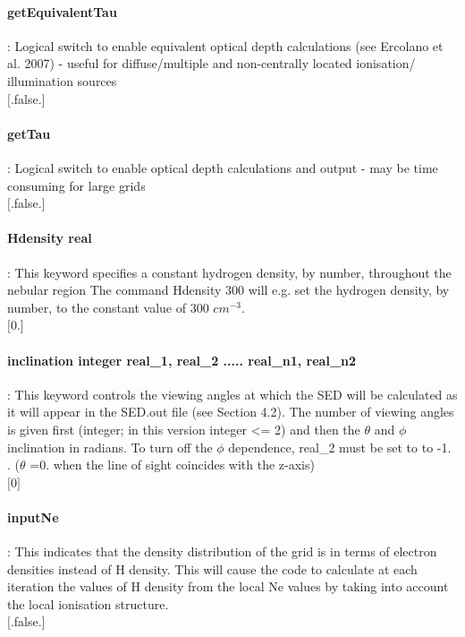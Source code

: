 \documentclass[11pt]{article}
\begin{document}
\paragraph    {getEquivalentTau} : Logical switch to enable equivalent optical depth calculations 
(see Ercolano et al. 2007) - useful for diffuse/multiple and non-centrally located ionisation/
illumination sources \\
                     $[$.false.$]$\\

\paragraph    {getTau} : Logical switch to enable optical depth calculations and output - may be 
                     time consuming for large grids\\
                     $[$.false.$]$\\

\paragraph    {Hdensity real }   : This keyword specifies a constant hydrogen density, 
		     by number, throughout the nebular region 
		     The command Hdensity 300 will e.g. set the 
		     hydrogen density, by number, to the constant value of 300 $cm^{-3}$.\\
		     $[$0.$]$\\

\paragraph    {inclination integer real\_1, real\_2 ..... real\_{n1}, real\_{n2}} : This keyword controls the
                     viewing angles at which the SED will be calculated as it will appear 
		     in the SED.out file (see Section 4.2). The number of viewing 
		     angles is given first (integer; in this version integer <= 2) and then the $\theta$
                     and $\phi$ inclination in radians. To turn off the $\phi$ dependence, real\_2 must be set to 
		     to -1. . 
		     ($\theta$ =0. when the line of sight coincides with the z-axis)\\
		     $[$0$]$\\

\paragraph    {inputNe  }        : This indicates that the density distribution of the grid is in 
                     terms of electron densities instead of H density. This will cause 
                     the code to calculate at each iteration the values of H density 
                     from the local Ne values by taking into account the local 
		     ionisation structure. \\
		     $[$.false.$]$\\
\end{document}
